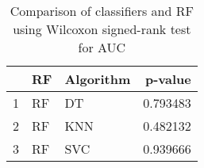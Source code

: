 \begin{table}
\footnotesize
\caption{Comparison of classifiers and RF using Wilcoxon signed-rank test for AUC}
\label{tab:RF wilcoxon AUC comparison}
\begin{tabular}{lllr}
\hline
 & RF & Algorithm & p-value \\
\hline
1 & RF & DT & 0.793483 \\
2 & RF & KNN & 0.482132 \\
3 & RF & SVC & 0.939666 \\
\hline
\end{tabular}
\end{table}
